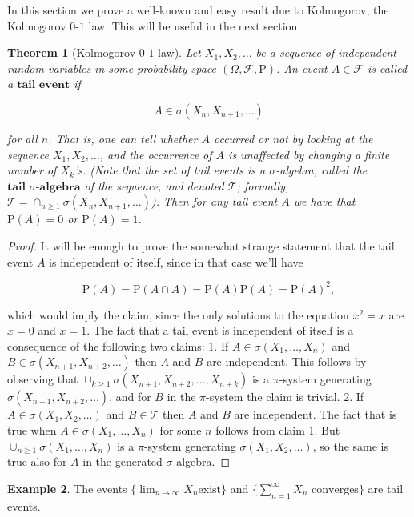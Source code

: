 \documentclass[11pt]{report}
\theoremstyle{plain}
\newtheorem{thm}{Theorem}[chapter]
\theoremstyle{definition}
\newtheorem{example}[thm]{Example}
\begin{document}
In this section we prove a well-known and easy result
due to Kolmogorov, the Kolmogorov $0$-$1$ law. This
will be useful in the next section.

\begin{thm}[Kolmogorov $0$-$1$ law]
Let $X_1,X_2,\ldots$ be a sequence of independent
random variables in some probability space
$(\Omega, \mathcal{F}, \mathrm{P})$. An event
$A\in \mathcal{F}$ is called a $\textbf{tail event}$
if

\[
A \in \sigma(X_n, X_{n+1}, \ldots)
\]

\noindent for all $n$. That is, one can tell whether $A$
occurred or not by looking at the sequence
$X_1,X_2,\ldots$, and the occurrence of $A$ is
unaffected by changing a finite number of $X_k$'s.
(Note that the set of tail events is a
$\sigma$-algebra, called the
$\textbf{tail } \sigma\textbf{-algebra}$ of the
sequence, and denoted $\mathcal{T}$; formally,
$\mathcal{T}=\cap_{n\ge 1}\sigma(X_n,X_{n+1},\ldots)$).
Then for any tail event $A$ we have that
$\mathrm{P}(A) = 0$ or $\mathrm{P}(A)=1$.
\end{thm}

\begin{proof}
It will be enough to prove the somewhat strange
statement that the tail event $A$ is independent of
itself, since in that case we'll have

\[
\mathrm{P}(A) = \mathrm{P}(A\cap A) = \mathrm{P}(A)\mathrm{P}(A) = \mathrm{P}(A)^2,
\]

\noindent which would imply the claim, since the only solutions
to the equation $x^2=x$ are $x=0$ and $x=1$. The fact
that a tail event is independent of itself is a
consequence of the following two claims: 1. If
$A \in \sigma(X_1,\ldots,X_n)$ and
$B\in \sigma(X_{n+1},X_{n+2},\ldots)$ then $A$ and $B$
are independent. This follows by observing that
$\cup_{k\ge1} \sigma(X_{n+1},X_{n+2},\ldots,X_{n+k})$
is a $\pi$-system generating
$\sigma(X_{n+1},X_{n+2},\ldots)$, and for $B$ in the
$\pi$-system the claim is trivial. 2. If
$A\in\sigma(X_1,X_2,\ldots)$ and $B\in\mathcal{T}$
then $A$ and $B$ are independent. The fact that is
true when $A\in \sigma(X_1,\ldots,X_n)$ for some $n$
follows from claim 1. But
$\cup_{n\ge 1} \sigma(X_1,\ldots,X_n)$ is a
$\pi$-system generating $\sigma(X_1,X_2,\ldots)$, so
the same is true also for $A$ in the generated
$\sigma$-algebra.
\end{proof}

\begin{example}
The events
$\{ \displaystyle \lim_{n\to\infty} X_n\textrm{
exist} \}$
and $\{ \sum_{n=1}^\infty X_n \textrm{ converges} \}$
are tail events.
\end{example}
\end{document}
